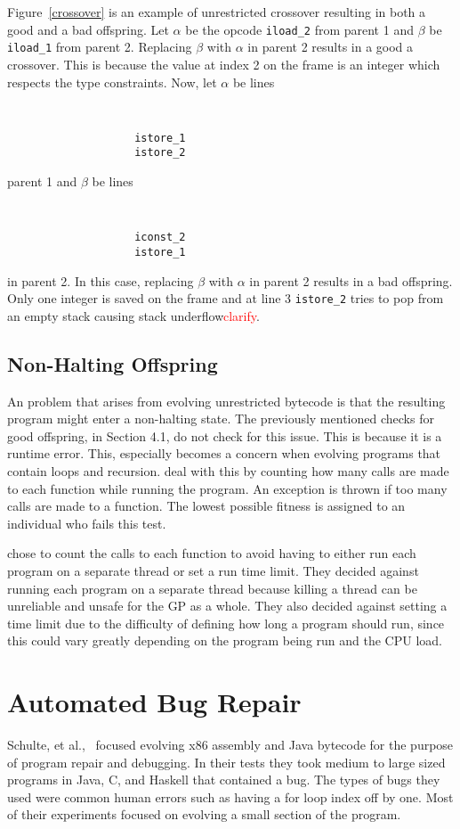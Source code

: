 \documentclass{sig-alternate}
\newcommand{\mycomment}[1]{\textcolor{red}{#1}}
\begin{document}
Figure~\ref{crossover} is an example of unrestricted crossover resulting in both a good and a bad offspring. Let $\alpha$ be the opcode \texttt{iload\_2} from parent 1 and $\beta$ be \texttt{iload\_1} from parent 2. Replacing $\beta$ with $\alpha$ in parent 2 results in a good a crossover. This is because the value at index 2 on the frame is an integer which respects the type constraints. Now, let $\alpha$ be lines
{\tt
\begin{verbatim}
                    istore_1
                    istore_2
\end{verbatim}}

\noindent parent 1 and $\beta$ be lines
{\tt
\begin{verbatim}
                    iconst_2
                    istore_1
\end{verbatim}}
\noindent 
in parent 2. In this case, replacing $\beta$ with $\alpha$ in parent 2 results in a bad offspring. Only one integer is saved on the frame and at line 3 \texttt{istore\_2} tries to pop from an empty stack causing stack underflow\mycomment{clarify}.

\subsection{Non-Halting Offspring}
An problem that arises from evolving unrestricted bytecode is that the resulting program might enter a non-halting state. The previously mentioned checks for good offspring, in Section 4.1, do not check for this issue. This is because it is a runtime error. This, especially becomes a concern when evolving programs that contain loops and recursion.
\cite{FINCH:2011} deal with this by counting how many calls are made to each function while running the program. An exception is thrown if too many calls are made to a function. The lowest possible fitness is assigned to an individual who fails this test.\par

\cite{FINCH:2011} chose to count the calls to each function to avoid having to either run each program on a separate thread or set a run time limit. They decided against running each program on a separate thread because killing a thread can be unreliable and unsafe for the GP as a whole. They also decided against setting a time limit due to the difficulty of defining how long a program should run, since this could vary greatly depending on the program being run and the CPU load.


\section{Automated Bug Repair}
Schulte, et al.,~\cite{Assembly:2010} focused evolving x86 assembly and Java bytecode for the purpose of program repair and debugging. In their tests they took medium to large sized programs in Java, C, and Haskell that contained a bug. The types of bugs they used were common human errors such as having a for loop index off by one. Most of their experiments focused on evolving a small section of the program. 
\end{document}
